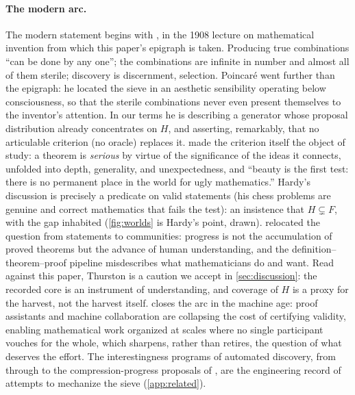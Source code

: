 \documentclass[11pt]{article}
\numberwithin{equation}{section}
\newcommand{\Amb}{F}
\newcommand{\Val}{H}
\theoremstyle{plain}
\theoremstyle{definition}
\theoremstyle{remark}
\begin{document}
\paragraph{The modern arc.}
The modern statement begins with \citet{poincare1914science}, in the 1908 lecture on
mathematical invention from which this paper's epigraph is taken. Producing true
combinations ``can be done by any one''; the combinations are infinite in number and almost
all of them sterile; discovery is discernment, selection. Poincar\'e went further than the
epigraph: he located the sieve in an aesthetic sensibility operating below consciousness, so
that the sterile combinations never even present themselves to the inventor's attention. In
our terms he is describing a generator whose proposal distribution already concentrates on
$\Val$, and asserting, remarkably, that no articulable criterion (no oracle) replaces it.
\citet{hardy1940apology} made the criterion itself the object of study: a theorem is
\emph{serious} by virtue of the significance of the ideas it connects, unfolded into depth,
generality, and unexpectedness, and ``beauty is the first test: there is no permanent place
in the world for ugly mathematics.'' Hardy's discussion is precisely a predicate on valid
statements (his chess problems are genuine and correct mathematics that fails the test):
an insistence that $\Val \subsetneq \Amb$, with the gap inhabited
(\cref{fig:worlds} is Hardy's point, drawn).
\citet{thurston1994proof} relocated the question from statements to communities: progress is
not the accumulation of proved theorems but the advance of human understanding, and the
definition--theorem--proof pipeline misdescribes what mathematicians do and want. Read
against this paper, Thurston is a caution we accept in \cref{sec:discussion}: the recorded
core is an instrument of understanding, and coverage of $\Val$ is a proxy for the harvest,
not the harvest itself. \citet{tao2025machine} closes the arc in the machine age: proof
assistants and machine collaboration are collapsing the cost of certifying validity,
enabling mathematical work organized at scales where no single participant vouches for the
whole, which sharpens, rather than retires, the question of what deserves the effort. The
interestingness programs of automated discovery, from \citet{lenat1977automated} through
\citet{colton2000interestingness} to the compression-progress proposals of
\citet{herrmann2026interestingness}, are the engineering record of attempts to mechanize the
sieve (\cref{app:related}).
\end{document}
